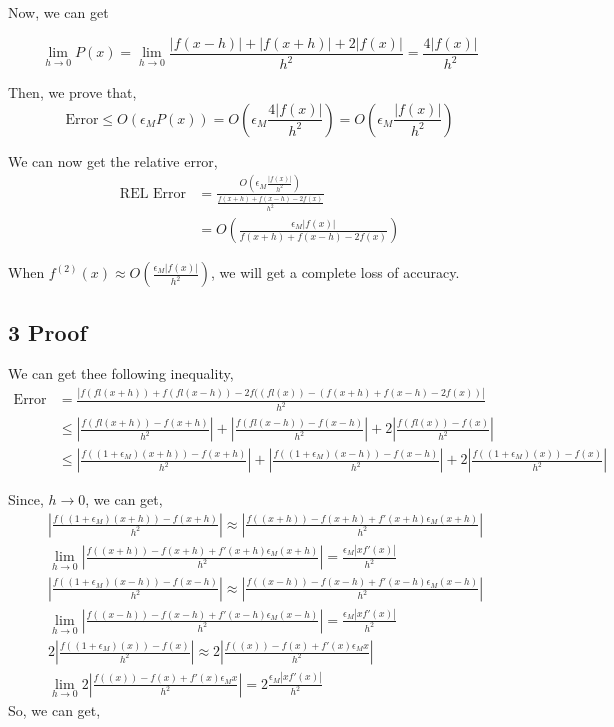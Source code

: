 \documentclass{article}
\begin{document}
Now, we can get

$$\lim \limits_{h \rightarrow 0}P(x) = \lim \limits_{h \rightarrow 0}\frac{|f(x-h)| + |f(x+h)| + 2|f(x)|}{h^2} = \frac{4|f(x)|}{h^2}$$

Then, we prove that,
$$\text{Error} \le O(\epsilon_M P(x)) = O(\epsilon_M\frac{4|f(x)|}{h^2}) =  O(\epsilon_M\frac{|f(x)|}{h^2})$$

We can now get the relative error,
\[
\begin{split}
\text{REL Error} &= \frac {O(\epsilon_M\frac{|f(x)|}{h^2})}{\frac{f(x + h) + f(x - h) - 2f(x)}{h^2}} \\
                &= O(\frac{\epsilon_M|f(x)|}{f(x + h) + f(x - h) - 2f(x)})
\end{split}
\]

When $f^{(2)}(x) \approx O(\frac{\epsilon_M |f(x)|}{h^2})$, we will get a complete loss of accuracy.
\subsection*{3 Proof}

We can get thee following inequality,
\[
\begin{split}
\text{Error} &= \frac{|f(fl(x+h)) + f(fl(x - h)) - 2f((fl(x)) - (f(x + h) + f(x - h) - 2f(x))|} {h^2} \\
            &\le |\frac{f(fl(x+h)) - f(x+h)}{h^2}| + |\frac{f(fl(x-h)) - f(x-h)}{h^2}| + 2|\frac{f(fl(x)) - f(x)}{h^2}| \\
            &\le |\frac{f((1+\epsilon_M)(x+h)) - f(x+h)}{h^2}| + |\frac{f((1+\epsilon_M)(x-h)) - f(x-h)}{h^2}| + 2|\frac{f((1+\epsilon_M)(x)) - f(x)}{h^2}|
\end{split}
\]

Since, $h \rightarrow 0$, we can get,
\[
\begin{split}
& |\frac{f((1+\epsilon_M)(x+h)) - f(x+h)}{h^2}| \approx |\frac{f((x+h)) - f(x+h) + f'(x+h)\epsilon_M(x+h)}{h^2}| \\
& \lim \limits_{h \rightarrow 0} |\frac{f((x+h)) - f(x+h) + f'(x+h)\epsilon_M(x+h)}{h^2}| = \frac{\epsilon_M |xf'(x)|}{h^2}\\
& |\frac{f((1+\epsilon_M)(x-h)) - f(x-h)}{h^2}| \approx |\frac{f((x-h)) - f(x-h) + f'(x-h)\epsilon_M(x-h)}{h^2}| \\
& \lim \limits_{h \rightarrow 0} |\frac{f((x-h)) - f(x-h) + f'(x-h)\epsilon_M(x-h)}{h^2}| = \frac{\epsilon_M |xf'(x)|}{h^2}\\
& 2|\frac{f((1+\epsilon_M)(x)) - f(x)}{h^2}| \approx 2|\frac{f((x)) - f(x) + f'(x)\epsilon_Mx}{h^2}| \\
& \lim \limits_{h \rightarrow 0} 2|\frac{f((x)) - f(x) + f'(x)\epsilon_Mx}{h^2}| =  2\frac{\epsilon_M |xf'(x)|}{h^2}
\end{split}
\]
So, we can get,
\end{document}
